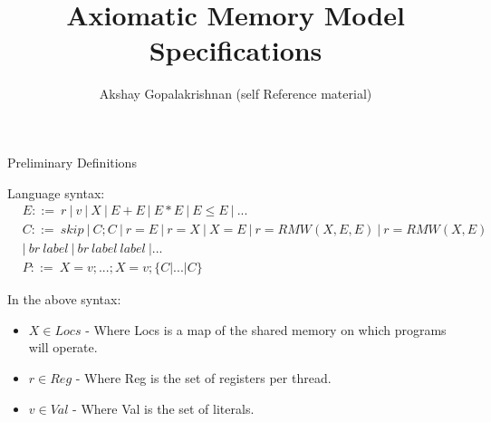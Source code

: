 \documentclass[xcolor={dvipsnames}, notes]{beamer}
\title{Axiomatic Memory Model Specifications}
\author{Akshay Gopalakrishnan (self Reference material)}
\begin{document}
    \begin{frame}
        \maketitle
    \end{frame}

    \begin{frame}{Preliminary Definitions}
        
        Language syntax: 
        \begin{align*}
            & E ::= \ r \ | \ v \ | \ X \ | \ E+E \ | \ E*E \ | \ E\leq E \ | \ ... \\
            & C ::= \ skip \ | \ C;C \ | \ r=E \ | \ r=X \ | \ X=E \ | \ r=RMW(X,E,E) \ | \ r=RMW(X,E) \\
            & | \ br \ label \ | \ br \ label \ label \ |... \\
            & P ::= \ X=v;...;X=v;\{C|...|C\}
        \end{align*}

        In the above syntax:
        \begin{itemize}
            \item $X \in Locs$ - Where Locs is a map of the shared memory on which programs will operate.
            \item $r \in Reg$ - Where Reg is the set of registers per thread.
            \item $v \in Val$ - Where Val is the set of literals. 
        \end{itemize}

    \end{frame}
\end{document}
